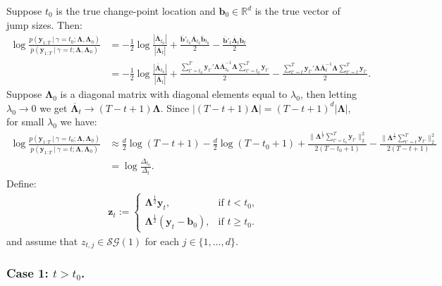\documentclass{article}
\begin{document}
Suppose $t_0$ is the true change-point location and $\mathbf{b}_0 \in \mathbb{R}^d$ is the true vector of jump sizes. Then:
\begin{align*}
    \log \frac{ p(\mathbf{y}_{1:T} \:|\:\gamma = t_0 ; \pmb{\Lambda}, \pmb{\Lambda}_0)}{ p(\mathbf{y}_{1:T} \:|\:\gamma = t ; \pmb{\Lambda}, \pmb{\Lambda}_0)} &= -\frac{1}{2}\log \frac{|\overline{\pmb{\Lambda}}_{t_0}|}{|\overline{\pmb{\Lambda}}_t|} + \frac{\overline{\mathbf{b}}'_{t_0} \overline{\pmb{\Lambda}}_{t_0} \overline{\mathbf{b}}_{t_0}}{2}-\frac{\overline{\mathbf{b}}'_t \overline{\pmb{\Lambda}}_t \overline{\mathbf{b}}_t}{2} \\
    &= -\frac{1}{2}\log \frac{|\overline{\pmb{\Lambda}}_{t_0}|}{|\overline{\pmb{\Lambda}}_t|} + \frac{ \sum_{t'=t_0}^T\mathbf{y}_{t'}'\pmb{\Lambda}\overline{\pmb{\Lambda}}^{-1}_{t_0}\pmb{\Lambda} \sum_{t'=t_0}^T\mathbf{y}_{t'}}{2}- \frac{ \sum_{t'=t}^T\mathbf{y}_{t'}'\pmb{\Lambda}\overline{\pmb{\Lambda}}^{-1}_{t}\pmb{\Lambda} \sum_{t'=t}^T\mathbf{y}_{t'}}{2}.
\end{align*}
Suppose $\pmb{\Lambda}_0$ is a diagonal matrix with diagonal elements equal to $\lambda_0$, then letting $\lambda_0 \to 0$ we get $\overline{\pmb{\Lambda}}_t \to (T-t+1)\pmb{\Lambda}$. Since $|(T-t+1)\pmb{\Lambda}| = (T-t+1)^d|\pmb{\Lambda}|$, for small $\lambda_0$ we have:
\begin{align*}
    \log \frac{ p(\mathbf{y}_{1:T} \:|\:\gamma = t_0 ; \pmb{\Lambda}, \pmb{\Lambda}_0)}{ p(\mathbf{y}_{1:T} \:|\:\gamma = t ; \pmb{\Lambda}, \pmb{\Lambda}_0)} &\approx\frac{d}{2}\log (T-t+1)  -\frac{d}{2}\log (T-t_0+1) + \frac{\lVert\pmb{\Lambda}^{\frac{1}{2}} \sum_{t'=t_0}^T\mathbf{y}_{t'}\rVert_2^2}{2(T-t_0+1)}- \frac{\lVert\pmb{\Lambda}^{\frac{1}{2}} \sum_{t'=t}^T\mathbf{y}_{t'}\rVert_2^2}{2(T-t+1)} \\
    &= \log \frac{\Delta_{t_0}}{\Delta_t}.
\end{align*}
Define:
\begin{align*}
    \mathbf{z}_t := 
    \begin{cases}
        \pmb{\Lambda}^{\frac{1}{2}}\mathbf{y}_t, & \text{if } t < t_0, \\
        \pmb{\Lambda}^{\frac{1}{2}}(\mathbf{y}_t - \mathbf{b}_0), &\text{if } t \geq t_0. 
    \end{cases}
\end{align*}
and assume that $z_{t,j} \in \mathcal{SG}(1)$ for each $j\in\{1,\ldots,d\}$.

\subsubsection*{Case 1: $t > t_0$.}
\end{document}
